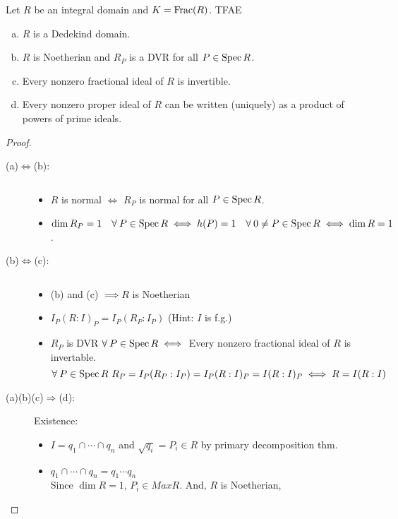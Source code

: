 \begin{theorem}
  Let $R$ be an integral domain and $K= \operatorname{Frac}(R)$. TFAE
  \begin{enumerate}[(a)]
    \item $R$ is a Dedekind domain.
    \item $R$ is Noetherian and $R_P$ is a DVR for all $P \in \operatorname{Spec} R$.
    \item Every nonzero fractional ideal of $R$ is invertible.
    \item Every nonzero proper ideal of $R$ can be written (uniquely) as a
      product of powers of prime ideals.
  \end{enumerate}

  \begin{proof} \mbox{}
    \begin{description}
      \item[\rm (a)$\Leftrightarrow$(b):] $ $
        \begin{itemize}
          \item $R$ is normal $\iff$ $R_P$ is normal for all $P \in \operatorname{Spec} R$.
          \item $\dim R_P = 1 \quad \forall P \in \Spec R \iff h(P) = 1 \quad
            \forall 0 \ne P \in \Spec R \iff \dim R = 1$.
        \end{itemize}
      \item[\rm (b)$\Leftrightarrow$(c):] $ $
        \begin{itemize}
          \item (b) and (c) $\implies R$ is Noetherian
          \item $I_P(R:I)_P = I_P(R_P:I_P)$ (Hint: $I$ is f.g.)
          \item $R_P$ is DVR $\forall P \in \Spec R \iff$ Every nonzero fractional
            ideal of $R$ is invertable.
            $$
            \forall P \in \Spec R\ R_P = I_P(R_P:I_P) = I_P(R:I)_P
             = I(R:I)_P \iff R = I(R:I)
            $$
        \end{itemize}
      \item[\rm (a)(b)(c)$\Rightarrow$(d):] $ $ \\
        Existence:
        \begin{itemize} 
          \item $I = q_1 \cap \cdots \cap q_n$ and $\sqrt{q_i} = P_i \in R $ by
             primary decomposition thm.
          \item $q_1 \cap \cdots \cap q_n = q_1 \cdots q_n$ \\
            Since $\dim R = 1$, $P_i \in Max R$. And, $R$ is Noetherian,

\end{itemize}
\end{description}
\end{proof}
\end{theorem}
